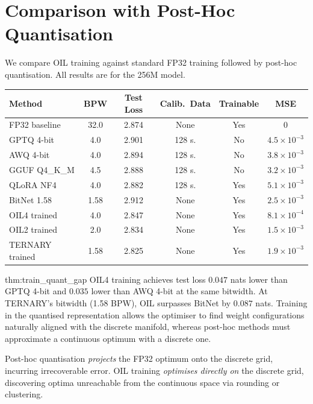 \section{Comparison with Post-Hoc Quantisation}
\label{sec:posthoc_comparison}
We compare OIL training against standard FP32 training followed by post-hoc quantisation.
All results are for the 256M model.
\begin{center}
\begin{tabular}{lccccc}
\toprule
\textbf{Method} & \textbf{BPW} & \textbf{Test Loss} & \textbf{Calib.\ Data} & \textbf{Trainable} & \textbf{MSE} \\
\midrule
FP32 baseline   & 32.0 & 2.874 & None   & Yes & 0 \\
GPTQ 4-bit      & 4.0  & 2.901 & 128 s. & No  & $4.5 \times 10^{-3}$ \\
AWQ 4-bit       & 4.0  & 2.894 & 128 s. & No  & $3.8 \times 10^{-3}$ \\
GGUF Q4\_K\_M    & 4.5  & 2.888 & 128 s. & No  & $3.2 \times 10^{-3}$ \\
QLoRA NF4       & 4.0  & 2.882 & 128 s. & Yes & $5.1 \times 10^{-3}$ \\
BitNet 1.58     & 1.58 & 2.912 & None   & Yes & $2.5 \times 10^{-3}$ \\
OIL4 trained    & 4.0  & 2.847 & None   & Yes & $8.1 \times 10^{-4}$ \\
OIL2 trained    & 2.0  & 2.834 & None   & Yes & $1.5 \times 10^{-3}$ \\
TERNARY trained & 1.58 & 2.825 & None   & Yes & $1.9 \times 10^{-3}$ \\
\bottomrule
\end{tabular}
\end{center}
\begin{table}[h]
\centering
\caption{OIL training vs.\ post-hoc quantisation on the 256M model. MSE is weight
reconstruction error relative to FP32.}
\label{tab:posthoc}
\end{table}
\begin{mythm}{thm:train_quant_gap}
OIL4 training achieves test loss $0.047$ nats lower than GPTQ 4-bit and $0.035$ lower than
AWQ 4-bit at the same bitwidth. At TERNARY's bitwidth (1.58 BPW), OIL surpasses BitNet by
$0.087$ nats. Training in the quantised representation allows the optimiser to find weight
configurations naturally aligned with the discrete manifold, whereas post-hoc methods must
approximate a continuous optimum with a discrete one.
\end{mythm}
Post-hoc quantisation \emph{projects} the FP32 optimum onto the discrete grid, incurring
irrecoverable error. OIL training \emph{optimises directly on} the discrete grid, discovering
optima unreachable from the continuous space via rounding or clustering.
